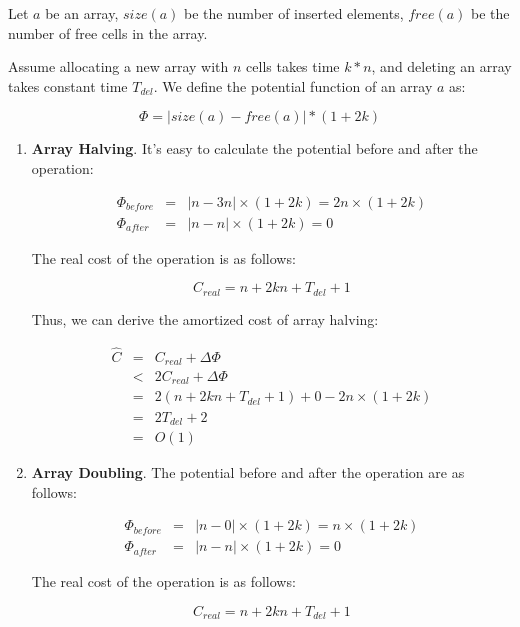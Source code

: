 Let $a$ be an array, $size(a)$ be the number of inserted elements, $free(a)$ be the number of free cells in the array.

Assume allocating a new array with $n$ cells takes time $k * n$, and deleting an array takes constant time $T_{del}$. We define the potential function of an array $a$ as:

\begin{equation}
\Phi = | size(a) - free(a) | * (1 + 2k)
\end{equation}

\begin{enumerate}

\item \textbf{Array Halving}. It's easy to calculate the potential before and after the operation:

\[
\begin{array}{lcl}
  \Phi_{before} & = & | n - 3n | \times (1 + 2k) = 2n \times (1 + 2k) \\
  \Phi_{after} & = & | n - n | \times (1 + 2k) = 0
\end{array}
\]

The real cost of the operation is as follows:

\[
C_{real} = n + 2kn + T_{del} + 1
\]

Thus, we can derive the amortized cost of array halving:

\[
\begin{array}{lcl}
\hat C & = & C_{real} + \Delta \Phi \\
       & < & 2 C_{real} + \Delta \Phi \\
       & = & 2(n + 2kn + T_{del} + 1) + 0 - 2n \times (1 + 2k) \\
       & = & 2T_{del} + 2 \\
       & = & O(1)
\end{array}
\]

\item \textbf{Array Doubling}. The potential before and after the operation are as follows:

\[
\begin{array}{lcl}
  \Phi_{before} & = & | n - 0 | \times (1 + 2k) = n \times (1 + 2k) \\
  \Phi_{after} & = & | n - n | \times (1 + 2k) = 0
\end{array}
\]

The real cost of the operation is as follows:

\[
C_{real} = n + 2kn + T_{del} + 1
\]


\end{enumerate}
